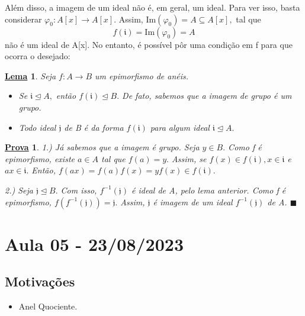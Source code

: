 \documentclass{article}
\newtheorem*{lemma*}{\underline{Lema}}
\newtheorem*{proof*}{\underline{Prova}}
\renewcommand\qedsymbol{$\blacksquare$}
\begin{document}
  Além disso, a imagem de um ideal não é, em geral, um ideal. Para ver isso, basta considerar \(\varphi_{0}:A[x]\rightarrow A[x].\)
  Assim, \(\mathrm{Im}(\varphi_{0}) = A\subseteq A[x],\) tal que 
  \[
    f(\mathfrak{i}) = \mathrm{Im}(\varphi_{0}) = A
  \]
não é um ideal de A[x]. No entanto, é possível pôr uma condição em f para que ocorra o desejado:
\begin{lemma*}
  Seja \(f:A\rightarrow B\) um epimorfismo de anéis.
  \begin{itemize}
    \item[1)] Se \(\mathfrak{i}\trianglelefteq{A},\) então \(f(\mathfrak{i})\trianglelefteq{B}.\) De fato, sabemos que a imagem
      de grupo é um grupo.
    \item[2)] Todo ideal \(\mathfrak{j}\) de B é da forma \(f(\mathfrak{i})\) para algum ideal \(\mathfrak{i}\trianglelefteq{A}.\)
  \end{itemize}
\end{lemma*}
\begin{proof*}
  1.) Já sabemos que a imagem é grupo. Seja \(y\in B.\) Como f é epimorfismo, existe
  \(a\in A\) tal que \(f(a) = y.\) Assim, se \(f(x)\in f(\mathfrak{i}), x\in \mathfrak{i}\) e 
  \(ax\in \mathfrak{i}.\) Então, \(f(ax) = f(a)f(x) = y f(x)\in f(\mathfrak{i}).\)

  2.) Seja \(\mathfrak{j}\trianglelefteq{B}.\) Com isso, \(f^{-1}(\mathfrak{j})\) é ideal de A, pelo lema anterior.
  Como f é epimorfismo, \(f(f^{-1}(\mathfrak{j})) = \mathfrak{j}.\) Assim, \(\mathfrak{j}\) é imagem de um ideal
  \(f^{-1}(\mathfrak{j})\) de A. \qedsymbol
\end{proof*}
\newpage

\section{Aula 05 - 23/08/2023}
\subsection{Motivações}
\begin{itemize}
  \item Anel Quociente.
\end{itemize}
\end{document}
